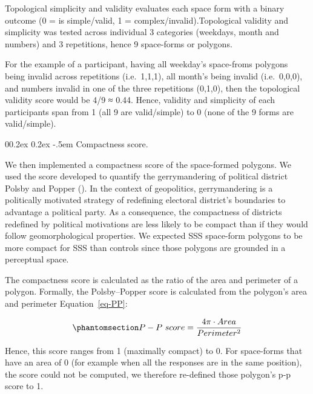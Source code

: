 \documentclass[
  man,
  floatsintext,
  longtable,
  a4paper,
  nolmodern,
  notxfonts,
  notimes,
  colorlinks=true,linkcolor=blue,citecolor=blue,urlcolor=blue]{apa7}
\makeatletter
\renewcommand{\paragraph}{\@startsection{paragraph}{4}{\parindent}%
	{0\baselineskip \@plus 0.2ex \@minus 0.2ex}%
	{-.5em}%
	{\normalfont\normalsize\bfseries\typesectitle}}
\makeatother
\begin{document}
Topological simplicity and validity evaluates each space form with a
binary outcome (0 = is simple/valid, 1 = complex/invalid).Topological
validity and simplicity was tested across individual 3 categories
(weekdays, month and numbers)
and 3 repetitions, hence 9 space-forms or polygons.

For the example of a participant, having all weekday's space-froms
polygons being invalid across repetitions (i.e.~1,1,1), all month's
being invalid (i.e.~0,0,0), and numbers invalid in one of the three
repetitions (0,1,0), then the topological validity score would be 4/9 ≈
0.44. Hence, validity and simplicity of each participants span from 1
(all 9 are valid/simple) to 0 (none of the 9 forms are valid/simple).

\paragraph{Compactness score.}\label{compactness-score}

We then implemented a compactness score of the space-formed polygons. We
used the score developed to quantify the gerrymandering of political
district Polsby and Popper (). In the
context of geopolitics, gerrymandering is a politically motivated
strategy of redefining electoral district's boundaries to advantage a
political party. As a consequence, the compactness of districts
redefined by political motivations are less likely to be compact than if
they would follow geomorphological properties. We expected SSS
space-form polygons to be more compact for SSS than controls since those
polygons are grounded in a perceptual space.

The compactness score is calculated as the ratio of the area and
perimeter of a polygon. Formally, the Polsby--Popper score is calculated
from the polygon's area and perimeter Equation~\ref{eq-PP}:

\begin{equation}\phantomsection\label{eq-PP}{
P - P\ score = \frac{4\pi \cdot Area}{Perimeter^2}
}\end{equation}

Hence, this score ranges from 1 (maximally compact) to 0. For
space-forms that have an area of 0 (for example when all the responses
are in the same position), the score could not be computed, we therefore
re-defined those polygon's p-p score to 1.
\end{document}
